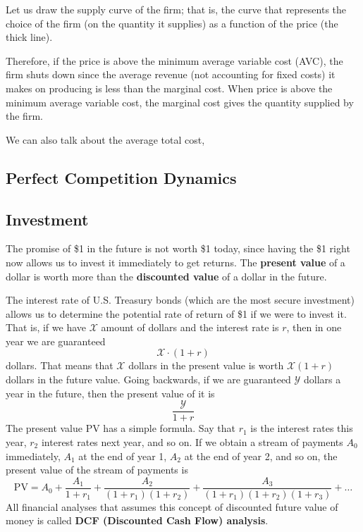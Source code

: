 \documentclass{article}
\begin{document}
      Let us draw the supply curve of the firm; that is, the curve that represents the choice of the firm (on the quantity it supplies) as a function of the price (the thick line).
      \begin{center}
      \end{center}
      Therefore, if the price is above the minimum average variable cost (AVC), the firm shuts down since the average revenue (not accounting for fixed costs) it makes on producing is less than the marginal cost. When price is above the minimum average variable cost, the marginal cost gives the quantity supplied by the firm. 

      We can also talk about the average total cost, 

  \subsection{Perfect Competition Dynamics}

  \subsection{Investment}

    \begin{definition}
      The promise of \$1 in the future is not worth \$1 today, since having the \$1 right now allows us to invest it immediately to get returns. The \textbf{present value} of a dollar is worth more than the \textbf{discounted value} of a dollar in the future. 

      The interest rate of U.S. Treasury bonds (which are the most secure investment) allows us to determine the potential rate of return of \$1 if we were to invest it. That is, if we have $\mathcal{X}$ amount of dollars and the interest rate is $r$, then in one year we are guaranteed 
      \[\mathcal{X} \cdot (1 + r)\]
      dollars. That means that $\mathcal{X}$ dollars in the present value is worth $\mathcal{X}(1 + r)$ dollars in the future value. Going backwards, if we are guaranteed $\mathcal{Y}$ dollars a year in the future, then the present value of it is
      \[\frac{\mathcal{Y}}{1 + r}\]
      The present value PV has a simple formula. Say that $r_1$ is the interest rates this year, $r_2$ interest rates next year, and so on. If we obtain a stream of payments $A_0$ immediately, $A_1$ at the end of year 1, $A_2$ at the end of year 2, and so on, the present value of the stream of payments is
      \[\text{PV} = A_0 + \frac{A_1}{1 + r_1} + \frac{A_2}{(1+r_1) (1+r_2)} + \frac{A_3}{(1+r_1) (1+r_2) (1+r_3)} + \ldots\]
      All financial analyses that assumes this concept of discounted future value of money is called \textbf{DCF (Discounted Cash Flow) analysis}.
    \end{definition}
\end{document}
